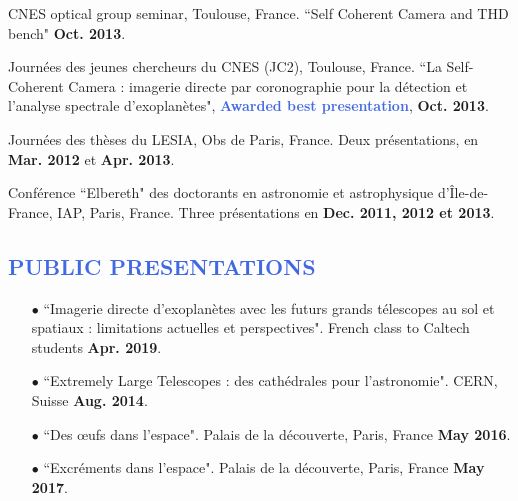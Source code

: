 \documentclass[12pt]{article}
\begin{document}
\begin{etaremune}
\item CNES optical group seminar, Toulouse, France. ``Self Coherent Camera and THD bench" \textbf{Oct. 2013}.

\item Journées des jeunes chercheurs du CNES (JC2), Toulouse, France. ``La Self-Coherent Camera : imagerie directe par coronographie pour la détection et l'analyse spectrale d'exoplanètes", \textcolor{RoyalBlue}{\textbf{Awarded best presentation}},  \textbf{Oct. 2013}.

\item Journées des thèses du LESIA, Obs de Paris, France. Deux présentations, en \textbf{Mar. 2012} et \textbf{Apr. 2013}.

\item Conférence ``Elbereth" des doctorants en astronomie et astrophysique d'Île-de-France, IAP, Paris, France. Three présentations en \textbf{Dec. 2011, 2012 et 2013}.

\end{etaremune}

\vspace{-0.8cm}
\textcolor{RoyalBlue}{\subsection{PUBLIC PRESENTATIONS}}

\begin{enumerate}\itemsep 3pt
\item[$\bullet$]  ``Imagerie directe d’exoplanètes avec les futurs grands télescopes au sol et spatiaux : limitations actuelles et perspectives". French class to Caltech students \textbf{Apr. 2019}.

\item[$\bullet$]  ``Extremely Large Telescopes : des cathédrales pour l’astronomie". CERN, Suisse \textbf{Aug. 2014}.

\item[$\bullet$] ``Des œufs dans l'espace". Palais de la découverte, Paris, France \textbf{May 2016}.

\item[$\bullet$] ``Excréments dans l'espace". Palais de la découverte, Paris, France \textbf{May 2017}.


\end{enumerate}
\end{document}
